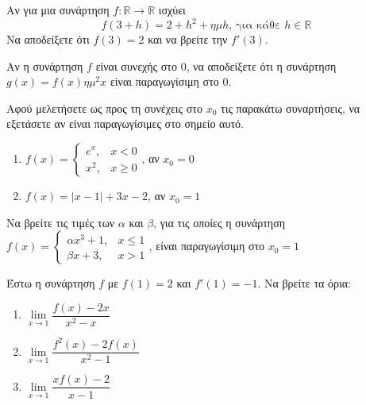 \documentclass{presentation}
\begin{document}
\begin{askisi}
  Αν για μια συνάρτηση $f:\mathbb{R}\to\mathbb{R}$ ισχύει
  $$f(3+h)=2+h^2+ημh \text{, για κάθε } h\in\mathbb{R}$$
  Να αποδείξετε ότι $f(3)=2$ και να βρείτε την $f'(3)$.

\end{askisi}

\begin{askisi}
  Αν η συνάρτηση $f$ είναι συνεχής στο $0$, να αποδείξετε ότι η συνάρτηση $g(x)=f(x)ημ^2x$ είναι παραγωγίσιμη στο $0$.

\end{askisi}

\begin{askisi}
  Αφού μελετήσετε ως προς τη συνέχεις στο $x_0$ τις παρακάτω συναρτήσεις, να εξετάσετε αν είναι παραγωγίσιμες στο σημείο αυτό.
  \begin{enumerate}
    \item<1-> $f(x)=\begin{cases}
              e^x, & x<0    \\
              x^2, & x\ge 0
            \end{cases}$, αν $x_0=0$
    \item<2-> $f(x)=|x-1|+3x-2$, αν $x_0=1$
  \end{enumerate}
\end{askisi}

\begin{askisi}
  Να βρείτε τις τιμές των $α$ και $β$, για τις οποίες η συνάρτηση
  $f(x)=\begin{cases}
      αx^3+1, & x\le 1 \\
      βx+3,   & x >1
    \end{cases}$, είναι παραγωγίσιμη στο $x_0=1$
\end{askisi}

\begin{askisi}
  Έστω η συνάρτηση $f$ με $f(1)=2$ και $f'(1)=-1$. Να βρείτε τα όρια:
  \begin{enumerate}
    \item<1-> $\lim\limits_{x \to 1}{ \dfrac{f(x)-2x}{x^2-x}}$
    \item<2-> $\lim\limits_{x \to 1}{ \dfrac{f^2(x)-2f(x)}{x^2-1}}$
    \item<3-> $\lim\limits_{x \to 1}{ \dfrac{xf(x)-2}{x-1}}$
  \end{enumerate}

\end{askisi}
\end{document}
